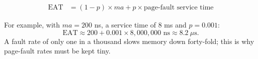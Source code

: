 \begin{formulas}
\begin{align*}
\text{EAT} &= (1-p)\times ma + p \times \text{page-fault service time}
\end{align*}
\end{formulas}
\noindent For example, with $ma = 200$ ns, a service time of 8 ms and $p = 0.001$:
\[
\text{EAT} \approx 200 + 0.001\times 8{,}000{,}000\text{ ns} \approx 8.2\ \mu\text{s}.
\]
A fault rate of only one in a thousand slows memory down forty-fold; this is why page-fault rates
must be kept tiny.
